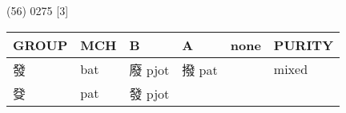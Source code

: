\documentclass[14pt,a4paper]{scrartcl}
\begin{document}
(56) 0275 {[}3{]}

\begin{longtable}[c]{@{}llllll@{}}
\toprule
\begin{minipage}[b]{0.14\columnwidth}\raggedright\strut
GROUP
\strut\end{minipage} &
\begin{minipage}[b]{0.14\columnwidth}\raggedright\strut
MCH
\strut\end{minipage} &
\begin{minipage}[b]{0.14\columnwidth}\raggedright\strut
B
\strut\end{minipage} &
\begin{minipage}[b]{0.14\columnwidth}\raggedright\strut
A
\strut\end{minipage} &
\begin{minipage}[b]{0.14\columnwidth}\raggedright\strut
none
\strut\end{minipage} &
\begin{minipage}[b]{0.14\columnwidth}\raggedright\strut
PURITY
\strut\end{minipage}\tabularnewline
\midrule
\endhead
\begin{minipage}[t]{0.14\columnwidth}\raggedright\strut
發
\strut\end{minipage} &
\begin{minipage}[t]{0.14\columnwidth}\raggedright\strut
bat
\strut\end{minipage} &
\begin{minipage}[t]{0.14\columnwidth}\raggedright\strut
廢 pjot
\strut\end{minipage} &
\begin{minipage}[t]{0.14\columnwidth}\raggedright\strut
撥 pat
\strut\end{minipage} &
\begin{minipage}[t]{0.14\columnwidth}\raggedright\strut
\strut\end{minipage} &
\begin{minipage}[t]{0.14\columnwidth}\raggedright\strut
mixed
\strut\end{minipage}\tabularnewline
\begin{minipage}[t]{0.14\columnwidth}\raggedright\strut
癹
\strut\end{minipage} &
\begin{minipage}[t]{0.14\columnwidth}\raggedright\strut
pat
\strut\end{minipage} &
\begin{minipage}[t]{0.14\columnwidth}\raggedright\strut
發 pjot
\strut\end{minipage} &

\end{longtable}
\end{document}
